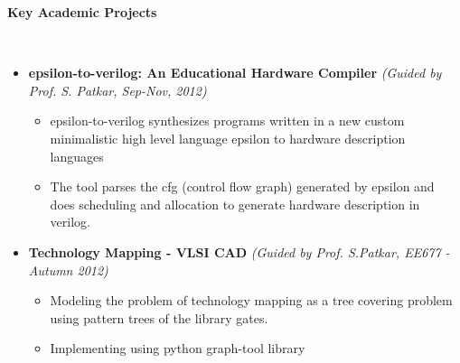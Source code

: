 \documentclass[a4paper,11pt]{article}
\newcommand{\isep}{-2 pt}
\newcommand{\lsep}{-0.5cm}
\newcommand{\resheading}[1]{{\small \colorbox{mygrey}{\begin{minipage}{0.975\textwidth}{\textbf{#1 \vphantom{p\^{E}}}}\end{minipage}}}}
\begin{document}
\begin{itemize}


\end{itemize}

\resheading{\textbf{\large Key Academic Projects}}\\[\lsep]
\begin{itemize}
    \item \textbf{ epsilon-to-verilog: An Educational Hardware Compiler} \hfill \emph{(Guided by Prof. S. Patkar, Sep-Nov, 2012) }  \\[-0.6cm]
    \begin{itemize} \itemsep \isep
        \item epsilon-to-verilog synthesizes programs written in a new custom minimalistic high level language epsilon to hardware description languages
        \item The tool parses the cfg (control flow graph) generated by epsilon and does scheduling and allocation to generate hardware description in verilog.
   \end{itemize}
    \item \textbf{Technology Mapping - VLSI CAD} \hfill \emph{(Guided by Prof. S.Patkar, EE677 - Autumn 2012)} \\[-0.6cm]
    \begin{itemize} \itemsep \isep
        \item Modeling the problem of technology mapping as a tree covering problem using pattern trees of the library gates.
        \item Implementing using python graph-tool library
    \end{itemize}


\end{itemize}
\end{document}
